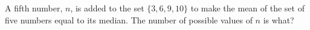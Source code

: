 A fifth number, $n$, is added to the set $\{ 3,6,9,10 \}$ to make the mean of the set of five numbers equal to its median. The number of possible values of $n$ is what?
